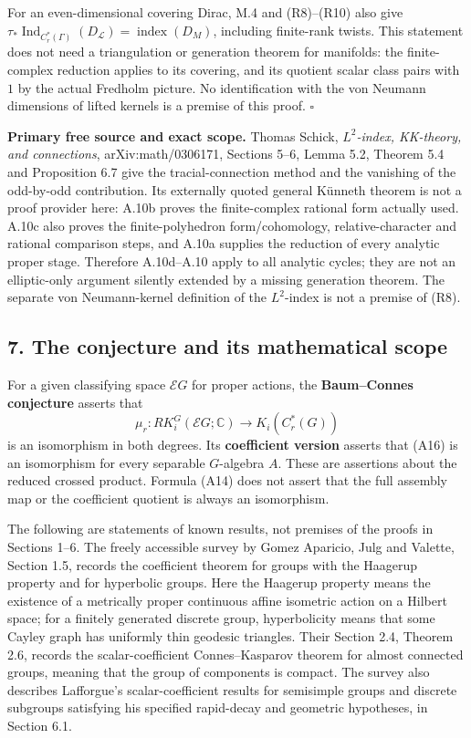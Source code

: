\documentclass[
  11pt,
]{article}
\begin{document}
For an even-dimensional covering Dirac, M.4 and (R8)--(R10) also give
\(\tau_*\operatorname{Ind}_{C_r^*(\Gamma)}(D_{\mathcal L})
=\operatorname{index}(D_M)\), including finite-rank twists. This
statement does not need a triangulation or generation theorem for
manifolds: the finite-complex reduction applies to its covering, and its
quotient scalar class pairs with \(1\) by the actual Fredholm picture.
No identification with the von Neumann dimensions of lifted kernels is a
premise of this proof. \(\square\)

\textbf{Primary free source and exact scope.} Thomas Schick,
\emph{\(L^2\)-index, KK-theory, and connections}, arXiv:math/0306171,
Sections 5--6, Lemma 5.2, Theorem 5.4 and Proposition 6.7 give the
tracial-connection method and the vanishing of the odd-by-odd
contribution. Its externally quoted general Künneth theorem is not a
proof provider here: A.10b proves the finite-complex rational form
actually used. A.10c also proves the finite-polyhedron form/cohomology,
relative-character and rational comparison steps, and A.10a supplies the
reduction of every analytic proper stage. Therefore A.10d--A.10 apply to
all analytic cycles; they are not an elliptic-only argument silently
extended by a missing generation theorem. The separate von
Neumann-kernel definition of the \(L^2\)-index is not a premise of (R8).

\subsection{7. The conjecture and its mathematical
scope}\label{the-conjecture-and-its-mathematical-scope}

For a given classifying space \(\mathcal E G\) for proper actions, the
\textbf{Baum--Connes conjecture} asserts that \[
\mu_r:RK_i^G(\mathcal E G;\mathbb C)\longrightarrow K_i(C_r^*(G))
\] is an isomorphism in both degrees. Its \textbf{coefficient version}
asserts that (A16) is an isomorphism for every separable \(G\)-algebra
\(A\). These are assertions about the reduced crossed product. Formula
(A14) does not assert that the full assembly map or the coefficient
quotient is always an isomorphism.

The following are statements of known results, not premises of the
proofs in Sections 1--6. The freely accessible survey by Gomez Aparicio,
Julg and Valette, Section 1.5, records the coefficient theorem for
groups with the Haagerup property and for hyperbolic groups. Here the
Haagerup property means the existence of a metrically proper continuous
affine isometric action on a Hilbert space; for a finitely generated
discrete group, hyperbolicity means that some Cayley graph has uniformly
thin geodesic triangles. Their Section 2.4, Theorem 2.6, records the
scalar-coefficient Connes--Kasparov theorem for almost connected groups,
meaning that the group of components is compact. The survey also
describes Lafforgue's scalar-coefficient results for semisimple groups
and discrete subgroups satisfying his specified rapid-decay and
geometric hypotheses, in Section 6.1.
\end{document}
